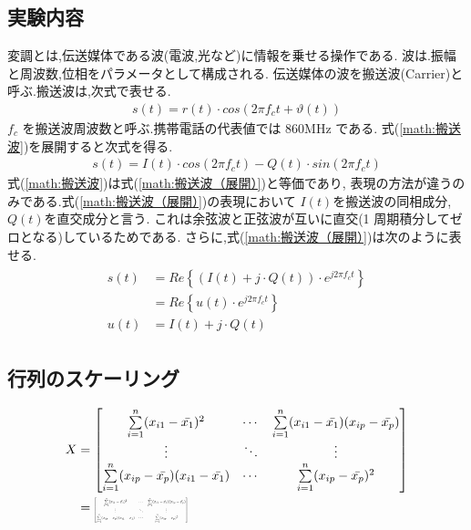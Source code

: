\documentclass{jsarticle}           %
\theoremstyle{plain}
\theoremstyle{definition}
\theoremstyle{remark}
\newcommand\scalemath[2]{\scalebox{#1}{\mbox{\ensuremath{\displaystyle #2}}}}
\begin{document}
\subsection{実験内容}
変調とは,伝送媒体である波(電波,光など)に情報を乗せる操作である.
波は.振幅と周波数,位相をパラメータとして構成される.
伝送媒体の波を搬送波(Carrier)と呼ぶ.搬送波は,次式で表せる.
\begin{align}
  \label{math:搬送波}                              
  s(t) = r(t) \cdot cos(2 \pi f_c t + \vartheta (t) ) 
\end{align}
$f_c$ を搬送波周波数と呼ぶ.携帯電話の代表値では 860MHz である.
式(\ref{math:搬送波})を展開すると次式を得る.
\begin{align}
  \label{math:搬送波（展開）}                               
  s(t) = I(t) \cdot cos(2 \pi f_c t) - Q(t) \cdot sin(2 \pi f_c t) 
\end{align}
式(\ref{math:搬送波})は式(\ref{math:搬送波（展開）})と等価であり,
表現の方法が違うのみである.式(\ref{math:搬送波（展開）})の表現において
$I(t)$を搬送波の同相成分,$Q(t)$を直交成分と言う.
これは余弦波と正弦波が互いに直交(1 周期積分してゼロとなる)しているためである.
さらに,式(\ref{math:搬送波（展開）})は次のように表せる.
\begin{align}
  \label{搬送波（展開）別表現}
  \begin{split}
  s(t) 
       & = Re \left\{ \left( I(t) + j \cdot Q(t) \right)   
  \cdot e^{j2 \pi f_c t} \right\} \\
       & = Re \left\{ u(t) \cdot e^{j2 \pi f_c t} \right\} \\
  u(t) & = I(t) + j \cdot Q(t)                             
  \end{split}
\end{align}

\subsection{行列のスケーリング}
\begin{align*}
  X
  &= \begin{bmatrix}
  \sum\limits_{i=1}^n (x_{i1}-\bar{x_1})^2 & \cdots 
  & \sum\limits_{i=1}^n (x_{i1}-\bar{x_1})(x_{ip}-\bar{x_p}) \\
  \vdots & \ddots & \vdots                                   \\
  \sum\limits_{i=1}^n (x_{ip}-\bar{x_p})(x_{i1}-\bar{x_1}) 
         & \cdots & \sum\limits_{i=1}^n (x_{ip}-\bar{x_p})^2 
  \end{bmatrix} \\
  &= \scalemath{0.3}{
  \begin{bmatrix}
  \sum\limits_{i=1}^n (x_{i1}-\bar{x_1})^2 & \cdots 
  & \sum\limits_{i=1}^n (x_{i1}-\bar{x_1})(x_{ip}-\bar{x_p}) \\
  \vdots & \ddots & \vdots                                   \\
  \sum\limits_{i=1}^n (x_{ip}-\bar{x_p})(x_{i1}-\bar{x_1}) 
         & \cdots & \sum\limits_{i=1}^n (x_{ip}-\bar{x_p})^2 
  \end{bmatrix}
  }
\end{align*}
\end{document}
